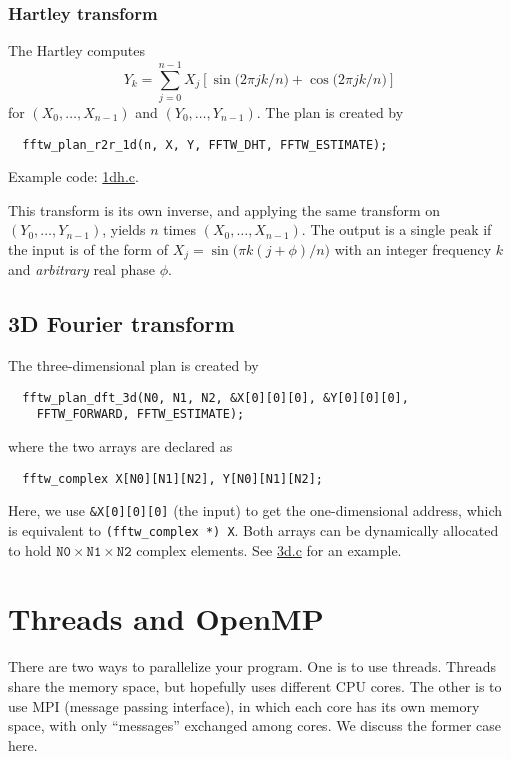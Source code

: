 \documentclass[12pt]{article}
\begin{document}
\subsubsection{Hartley transform}
The Hartley computes
\begin{equation}
  Y_k = \sum_{j = 0}^{n - 1} X_j
    \left[
      \sin\big( 2 \pi j k / n \big)
      + \cos\big( 2 \pi j k / n \big)
    \right]
\end{equation}
%
for $(X_0, \dots, X_{n - 1})$ and $(Y_0, \dots, Y_{n-1})$.
%
The plan is created by
\begin{verbatim}
  fftw_plan_r2r_1d(n, X, Y, FFTW_DHT, FFTW_ESTIMATE);
\end{verbatim}
Example code: \url{1dh.c}.


This transform is its own inverse,
%
and applying the same transform on $(Y_0, \dots, Y_{n-1})$,
  yields $n$ times $(X_0, \dots, X_{n-1})$.
The output is a single peak if the input is of the form of
  $X_j = \sin\big(\pi k (j + \phi) / n \big)$
  with an integer frequency $k$
  and \emph{arbitrary} real phase $\phi$.





\subsection{3D Fourier transform}

The three-dimensional plan is created by
\begin{verbatim}
  fftw_plan_dft_3d(N0, N1, N2, &X[0][0][0], &Y[0][0][0],
    FFTW_FORWARD, FFTW_ESTIMATE);
\end{verbatim}
where the two arrays are declared as
\begin{verbatim}
  fftw_complex X[N0][N1][N2], Y[N0][N1][N2];
\end{verbatim}
%
Here, we use
\texttt{\&X[0][0][0]} (the input)
to get the one-dimensional address,
which is equivalent to
\texttt{(fftw\_complex *) X}.
%
Both arrays can be dynamically allocated
to hold $\mathtt{N0} \times \mathtt{N1} \times \mathtt{N2}$
complex elements.
%
See \url{3d.c} for an example.




\section{Threads and OpenMP}

There are two ways to parallelize your program.
%
One is to use threads.
%
Threads share the memory space,
  but hopefully uses different CPU cores.
%
The other is to use MPI (message passing interface),
%
in which each core has its own memory space,
%
with only ``messages'' exchanged among cores.
%
We discuss the former case here.
\end{document}
